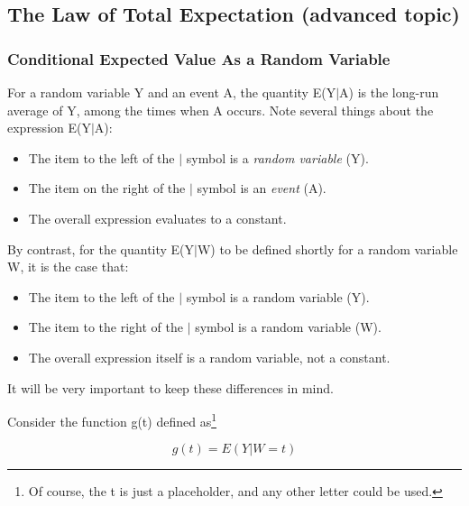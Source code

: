 \subsection{The Law of Total Expectation (advanced topic)}
\label{lte}

\subsubsection{Conditional Expected Value As a Random Variable}

For a random variable Y and an event A, the quantity E(Y$|$A) is the
long-run average of Y, among the times when A occurs.  Note several
things about the expression E(Y$|$A):

\begin{itemize}

\item The item to the left of the $|$ symbol is a {\it random variable} (Y).

\item The item on the right of the $|$ symbol is an {\it event} (A).

\item The overall expression evaluates to a constant.

\end{itemize}

By contrast, for the quantity E(Y$|$W) to be defined shortly for a random
variable W, it is the case that:

\begin{itemize}

\item The item to the left of the $|$ symbol is a random variable (Y).

\item The item to the right of the $|$ symbol is a random variable (W).

\item The overall expression itself is a random variable, not a constant.

\end{itemize}

It will be very important to keep these differences in mind.

Consider the function g(t) defined as\footnote{Of course, the t is just
a placeholder, and any other letter could be used.} 

\begin{equation}
\label{thisisg}
g(t)=E(Y|W=t)
\end{equation}

